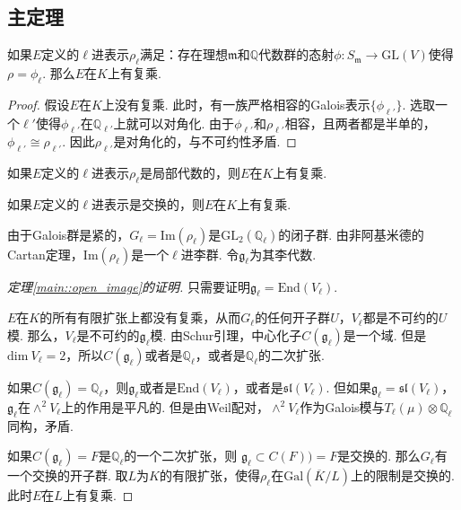 \subsection{主定理}

\begin{cthm}
    如果$E$定义的$\ell$进表示$\rho_{\ell}$满足：存在理想$\mathfrak{m}$和$\mathbb{Q}$代数群的态射$\phi: S_{\mathfrak{m}}\to \mathrm{GL}(V)$使得$\rho = \phi_{\ell}$. 那么$E$在$K$上有复乘.
\end{cthm}

\begin{proof}
    假设$E$在$K$上没有复乘. 此时，有一族严格相容的Galois表示$\{\phi_{\ell'}\}$. 选取一个$\ell'$使得$\phi_{\ell'}$在$\mathbb{Q}_{\ell'}$上就可以对角化. 由于$\phi_{\ell'}$和$\rho_{\ell'}$相容，且两者都是半单的，$\phi_{\ell'}\cong \rho_{\ell'}$. 因此$\rho_{\ell'}$是对角化的，与不可约性矛盾.
\end{proof}

\begin{ccor}
    如果$E$定义的$\ell$进表示$\rho_{\ell}$是局部代数的，则$E$在$K$上有复乘. \label{reps::when_cm}
\end{ccor}

\begin{ccor}
    如果$E$定义的$\ell$进表示是交换的，则$E$在$K$上有复乘.
\end{ccor}

由于Galois群是紧的，$G_{\ell} = \mathrm{Im}(\rho_\ell)$是$\mathrm{GL}_2(\mathbb{Q}_{\ell})$的闭子群. 由非阿基米德的Cartan定理，$\mathrm{Im}(\rho_{\ell})$是一个$\ell$进李群. 令$\mathfrak{g}_{\ell}$为其李代数.

\begin{proof}[定理\ref{main::open_image}的证明]
    只需要证明$\mathfrak{g}_{\ell} = \mathrm{End}(V_{\ell})$.

    $E$在$K$的所有有限扩张上都没有复乘，从而$G_{\ell}$的任何开子群$U$，$V_{\ell}$都是不可约的$U$模. 那么，$V_{\ell}$是不可约的$\mathfrak{g}_{\ell}$模. 由Schur引理，中心化子$C(\mathfrak{g}_{\ell})$是一个域. 但是$\mathrm{dim}\ V_{\ell}=2$，所以$C(\mathfrak{g}_{\ell})$或者是$\mathbb{Q}_{\ell}$，或者是$\mathbb{Q}_{\ell}$的二次扩张.

    如果$C(\mathfrak{g}_{\ell}) = \mathbb{Q}_{\ell}$，则$\mathfrak{g}_{\ell}$或者是$\mathrm{End}(V_{\ell})$，或者是$\mathfrak{sl}(V_{\ell})$. 但如果$\mathfrak{g}_{\ell} = \mathfrak{sl}(V_{\ell})$，$\mathfrak{g}_{\ell}$在$\wedge^2 V_{\ell}$上的作用是平凡的. 但是由Weil配对，$\wedge^2 V_{\ell}$作为Galois模与$T_{\ell}(\mu)\otimes \mathbb{Q}_{\ell}$同构，矛盾.

    如果$C(\mathfrak{g}_{\ell}) = F$是$\mathbb{Q}_{\ell}$的一个二次扩张，则
    $\mathfrak{g}_{\ell}\subset C(F)) = F$是交换的. 那么$G_{\ell}$有一个交换的开子群.
    取$L$为$K$的有限扩张，使得$\rho_{\ell}$在$\mathrm{Gal}(\overline{K}/L)$上的限制是交换的.
    此时$E$在$L$上有复乘.

\end{proof}
